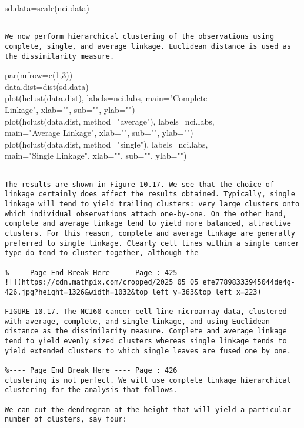 \documentclass[10pt]{article}
\begin{document}
\begin{displayquote}
sd.data=scale(nci.data)
\end{displayquote}

\begin{verbatim}

We now perform hierarchical clustering of the observations using complete, single, and average linkage. Euclidean distance is used as the dissimilarity measure.
\end{verbatim}

\begin{displayquote}
par(mfrow=c(1,3))\\
data.dist=dist(sd.data)\\
plot(hclust(data.dist), labels=nci.labs, main="Complete\\
Linkage", xlab="", sub="", ylab="")\\
plot(hclust(data.dist, method="average"), labels=nci.labs,\\
main="Average Linkage", xlab="", sub="", ylab="")\\
plot(hclust(data.dist, method="single"), labels=nci.labs,\\
main="Single Linkage", xlab="", sub="", ylab="")
\end{displayquote}

\begin{verbatim}

The results are shown in Figure 10.17. We see that the choice of linkage certainly does affect the results obtained. Typically, single linkage will tend to yield trailing clusters: very large clusters onto which individual observations attach one-by-one. On the other hand, complete and average linkage tend to yield more balanced, attractive clusters. For this reason, complete and average linkage are generally preferred to single linkage. Clearly cell lines within a single cancer type do tend to cluster together, although the

%---- Page End Break Here ---- Page : 425
![](https://cdn.mathpix.com/cropped/2025_05_05_efe77898333945044de4g-426.jpg?height=1326&width=1032&top_left_y=363&top_left_x=223)

FIGURE 10.17. The NCI60 cancer cell line microarray data, clustered with average, complete, and single linkage, and using Euclidean distance as the dissimilarity measure. Complete and average linkage tend to yield evenly sized clusters whereas single linkage tends to yield extended clusters to which single leaves are fused one by one.

%---- Page End Break Here ---- Page : 426
clustering is not perfect. We will use complete linkage hierarchical clustering for the analysis that follows.

We can cut the dendrogram at the height that will yield a particular number of clusters, say four:
\end{verbatim}
\end{document}
